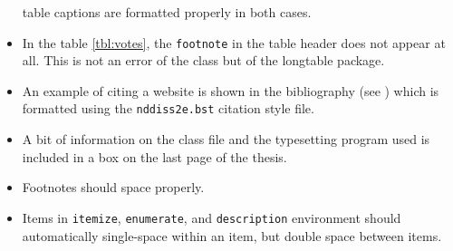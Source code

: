 \documentclass[draft,numrefs,sort&compress]{nddiss2e}
\begin{document}
\begin{itemize}
table captions are formatted properly in both cases.
\item In the table \ref{tbl:votes}, the \verb+footnote+ in the table header 
does not appear at all. This is not an error of the \nddiss\/ class but of the
\textsf{longtable} package.
\item An example of citing a website is shown in the bibliography (see
\citep{gairley2000}) which is formatted using the \verb+nddiss2e.bst+
citation style file.
\item A bit of information on the \nddiss\/ class file and the typesetting program
used is included in a box on the last page of the thesis.
\item Footnotes should space properly.
\item Items in \verb+itemize+, \verb+enumerate+, and \verb+description+ environment
should automatically single-space within an item, but double space between items.
\end{itemize}

%
%




%
%



%
%



%
%



%
%



%
%



%
%




%
%

\appendix




%
%

 \backmatter
\end{document}
